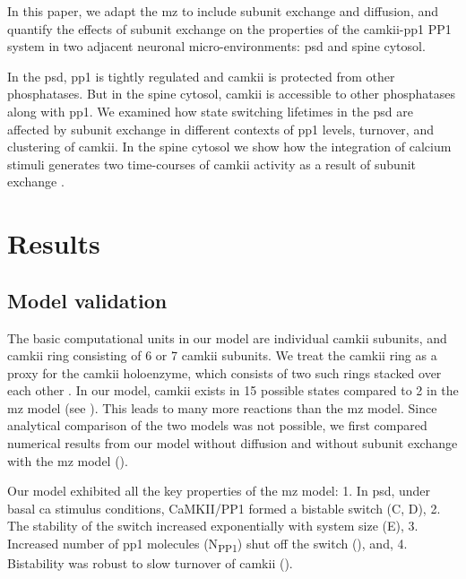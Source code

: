 \documentclass[9pt,lineno]{elife}
\newcommand\SUB[2]{#1\textsubscript{#2}}
\begin{document}
In this paper, we adapt the \gls{mz} \citep{miller_stability_2005} to include
subunit exchange and diffusion, and quantify the effects of subunit exchange on
the properties of the \gls{camkii}-\gls{pp1} PP1 system in two adjacent neuronal
micro-environments: \gls{psd} and spine cytosol. 

In the \gls{psd}, \gls{pp1} is tightly regulated and \gls{camkii} is protected
from other phosphatases. But in the spine cytosol, \gls{camkii} is accessible to
other phosphatases along with \gls{pp1}. We examined how state switching
lifetimes in the \gls{psd} are affected by subunit exchange in different
contexts of \gls{pp1} levels, turnover, and clustering of \gls{camkii}. In the
spine cytosol we show how the integration of calcium stimuli generates two
time-courses of \gls{camkii} activity as a result of subunit exchange
\citep{chang_camkii_2017}.

\section{Results}\label{sec:results} 

\subsection{Model validation}\label{subsec:model-validation}

The basic computational units in our model are individual \gls{camkii} subunits,
and \gls{camkii} ring consisting of 6 or 7 \gls{camkii} subunits. We treat the
\gls{camkii} ring as a proxy for the \gls{camkii} holoenzyme, which consists of
two such rings stacked over each other
\citep{woodgett_calmodulin-dependent,hoelz_crystal_2003,chao_mechanism_2011}. In
our model, \gls{camkii} exists in 15 possible states compared to 2 in the
\gls{mz} model (see ). This leads to many
more reactions than the \gls{mz} model. Since analytical comparison of the two
models was not possible, we first compared numerical results from our model
without diffusion and without subunit exchange with the \gls{mz} model
().

Our model exhibited all the key properties of the \gls{mz} model: 1. In
\gls{psd}, under basal \gls{ca}  stimulus conditions, CaMKII/PP1 formed a
bistable switch (C, D), 2. The stability of the switch increased
exponentially with system size (E), 3.  Increased number of
\gls{pp1} molecules (\SUB{N}{PP1}) shut off the switch (),
and, 4. Bistability was robust to slow turnover of \gls{camkii}
().
\end{document}
